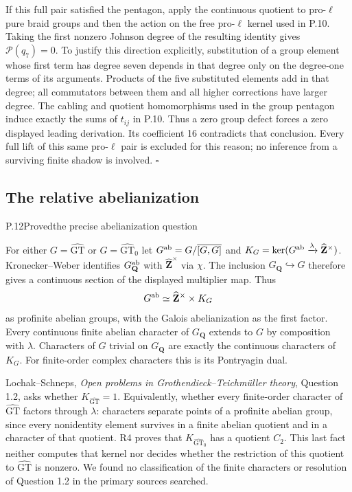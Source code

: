 If this full pair satisfied the pentagon, apply the continuous
quotient to pro-$\ell$ pure braid groups and then the action on
the free pro-$\ell$ kernel used in P.10. Taking the first
nonzero Johnson degree of the resulting identity gives
$\mathcal P(q_7)=0$. To justify this direction explicitly,
substitution of a group element whose first term has degree seven
depends in that degree only on the degree-one terms of its
arguments. Products of the five substituted elements add in that
degree; all commutators between them and all higher corrections
have larger degree. The cabling and quotient homomorphisms used
in the group pentagon induce exactly the sums of $t_{ij}$ in
P.10. Thus a zero group defect forces a zero displayed leading
derivation. Its coefficient 16 contradicts that conclusion.
Every full lift of this same pro-$\ell$ pair is excluded for this
reason; no inference from a surviving finite shadow is involved.
\hfill$\square$

\subsection{The relative abelianization}


\begin{statement}{P.12}{Proved}{the precise abelianization question}
\citep[Question 1.2]{LitLochakSchnepsOpenProblems}
\end{statement}
For either $G=\widehat{\mathrm{GT}}$ or
$G=\widehat{\mathrm{GT}}_0$ let
$G^{\rm ab}=G/\overline{[G,G]}$ and
$K_G=\ker(G^{\rm ab}\xrightarrow{\lambda}\widehat{\mathbf Z}^{\times})$.
Kronecker--Weber identifies
$G_{\mathbf Q}^{\rm ab}$ with $\widehat{\mathbf Z}^{\times}$
via $\chi$.  The inclusion $G_{\mathbf Q}\hookrightarrow G$
therefore gives a continuous section of the displayed multiplier
map.  Thus
\[
 G^{\rm ab}\simeq\widehat{\mathbf Z}^{\times}\times K_G
\]
as profinite abelian groups, with the Galois abelianization as the
first factor.  Every continuous finite abelian character of
$G_{\mathbf Q}$ extends to $G$ by composition with $\lambda$.
Characters of $G$ trivial on $G_{\mathbf Q}$ are exactly the
continuous characters of $K_G$.  For finite-order complex
characters this is its Pontryagin dual.

Lochak--Schneps, \emph{Open problems in Grothendieck--Teichm\"uller
theory}, Question 1.2, asks whether $K_{\widehat{\mathrm{GT}}}=1$.
Equivalently, whether every finite-order character of
$\widehat{\mathrm{GT}}$ factors through $\lambda$: characters
separate points of a profinite abelian group, since every nonidentity
element survives in a finite abelian quotient and in a character
of that quotient.  R4 proves that
$K_{\widehat{\mathrm{GT}}_0}$ has a quotient $C_2$.
This last fact neither computes that kernel nor decides whether
the restriction of this quotient to $\widehat{\mathrm{GT}}$
is nonzero.  We found no classification of the finite characters
or resolution of Question 1.2 in the primary sources searched.

